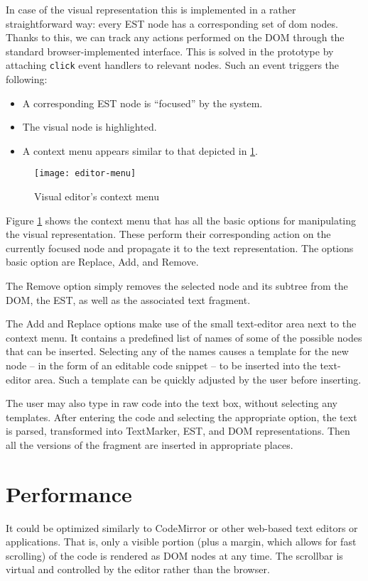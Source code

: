 In case of the visual representation this is implemented in a rather
straightforward way: every EST node has a corresponding set of \acrshort{dom}
nodes. Thanks to this, we can track any actions performed on the DOM through the
standard browser-implemented interface. This is solved in the prototype by
attaching \texttt{click} event handlers to relevant nodes. Such an event
triggers the following:
\begin{itemize}
    \item A corresponding EST node is ``focused'' by the system.
    \item The visual node is highlighted.
    \item A context menu appears similar to that depicted in
      \ref{fig:editor-menu}.
\end{itemize}

\begin{figure}[h!]
\centering \texttt{[image: editor-menu]}
\caption{Visual editor's context menu}
\label{fig:editor-menu}
\end{figure}

Figure \ref{fig:editor-menu} shows the context menu that has all the basic options for manipulating the visual representation. These perform their corresponding action on the currently focused node and propagate it to the text representation. The options basic option are Replace, Add, and Remove.

The Remove option simply removes the selected node and its subtree from the
DOM, the EST, as well as the associated text fragment.

The Add and Replace options make use of the small text-editor area next to the context menu. It contains a predefined list of names of some of the possible nodes that can be inserted. Selecting any of the names causes a template for the new node -- in the form of an editable code snippet -- to be inserted into the text-editor area. Such a template can be quickly adjusted by the user before inserting.

The user may also type in raw code into the text box, without selecting any templates. After entering the code and selecting the appropriate option, the text is parsed, transformed into TextMarker, EST, and DOM representations. Then all the versions of the fragment are inserted in appropriate places.


\section{Performance}
It could be optimized similarly to CodeMirror or other web-based text editors or
applications. That is, only a visible portion (plus a margin, which allows for
fast scrolling) of the code is rendered as DOM nodes at any time. The scrollbar
is virtual and controlled by the editor rather than the browser.


